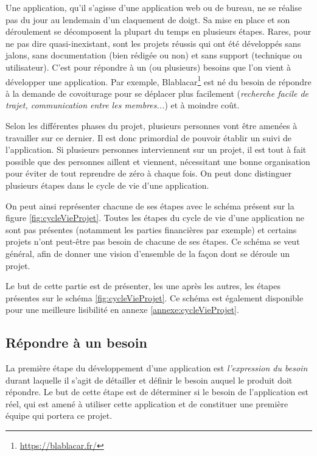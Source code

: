 Une application, qu'il s'agisse d'une application web ou de bureau, ne se réalise pas du jour au lendemain d'un claquement de doigt. Sa mise en place et son déroulement se décomposent la plupart du temps en plusieurs étapes. Rares, pour ne pas dire quasi-inexistant, sont les projets réussis qui ont été développés sans jalons, sans documentation (bien rédigée ou non) et sans support (technique ou utilisateur). C'est pour répondre à un (ou plusieurs) besoins que l'on vient à développer une application. Par exemple, Blablacar\footnote{\url{https://blablacar.fr/}} est né du besoin de répondre à la demande de covoiturage pour se déplacer plus facilement (\emph{recherche facile de trajet, communication entre les membres...}) et à moindre coût.

Selon les différentes phases du projet, plusieurs personnes vont être amenées à travailler sur ce dernier. Il est donc primordial de pouvoir établir un suivi de l'application. Si plusieurs personnes interviennent sur un projet, il est tout à fait possible que des personnes aillent et viennent, nécessitant une bonne organisation pour éviter de tout reprendre de zéro à chaque fois. On peut donc distinguer plusieurs étapes dans le cycle de vie d'une application.

On peut ainsi représenter chacune de ses étapes avec le schéma présent sur la figure \ref{fig:cycleVieProjet}. Toutes les étapes du cycle de vie d'une application ne sont pas présentes (notamment les parties financières par exemple) et certains projets n'ont peut-être pas besoin de chacune de ses étapes. Ce schéma se veut général, afin de donner une vision d'ensemble de la façon dont se déroule un projet.

Le but de cette partie est de présenter, les une après les autres, les étapes présentes sur le schéma \ref{fig:cycleVieProjet}. Ce schéma est également disponible pour une meilleure lisibilité en annexe \ref{annexe:cycleVieProjet}.


\subsection{Répondre à un besoin}

La première étape du développement d'une application est \emph{l'expression du besoin} durant laquelle il s'agit de détailler et définir le besoin auquel le produit doit répondre. Le but de cette étape est de déterminer si le besoin de l'application est réel, qui est amené à utiliser cette application et de constituer une première équipe qui portera ce projet.

